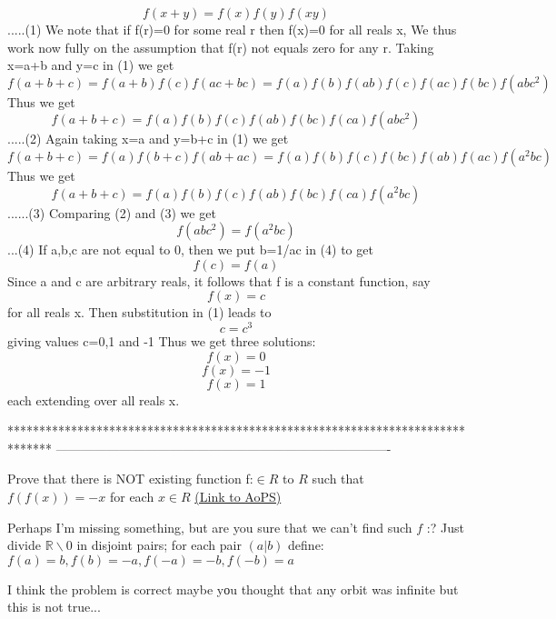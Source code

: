 \begin{mysolution}
	\[f(x+y)=f(x)f(y)f(xy)\]         .....(1)
We note that if f(r)=0 for some real r then f(x)=0 for all reals x,
We thus work now fully on the assumption that f(r) not equals zero for any r. 
 Taking x=a+b and y=c in (1) we get
  \[f(a+b+c)
    =f(a+b)f(c)f(ac+bc)
    =f(a)f(b)f(ab)f(c)f(ac)f(bc)f(abc^2)\]
Thus we get 
\[f(a+b+c)=f(a)f(b)f(c)f(ab)f(bc)f(ca)f(abc^2)\]     .....(2)
Again taking x=a and y=b+c in (1) we get
\[f(a+b+c)
=f(a)f(b+c)f(ab+ac)
=f(a)f(b)f(c)f(bc)f(ab)f(ac)f(a^2bc)\]
Thus we get
\[f(a+b+c)=f(a)f(b)f(c)f(ab)f(bc)f(ca)f(a^2bc)\]    ......(3)
Comparing (2) and (3) we get
\[f(abc^2)=f(a^2bc)\]            ...(4)
If a,b,c are not equal to 0, then we put b=1/ac in (4) to get
\[f(c)=f(a)\]
Since a and c are arbitrary reals, it follows that f is a constant function, say 
\[f(x)=c\] for all reals x.
Then substitution in (1) leads to
\[c=c^3\]
giving values c=0,1 and -1
Thus we get three solutions:
\[ f(x)=0\]
\[f(x)=-1\]
\[f(x)=1\]
each extending over all reals x.
\end{mysolution}
*******************************************************************************
-------------------------------------------------------------------------------

\begin{problem}
	Prove that there is NOT existing function f:$\in R$ to $R$ such that $f(f(x))=-x$ for each $x\in R$
	\flushright \href{https://artofproblemsolving.com/community/c6h56637}{(Link to AoPS)}
\end{problem}



\begin{mysolution}
	Perhaps I'm missing something, but are you sure that we can't find such $f$  :? 
Just divide $\mathbb{R}\backslash 0$ in disjoint pairs; for each pair $(a|b)$ define:
$f(a)=b, f(b)=-a, f(-a)=-b, f(-b)=a$
\end{mysolution}



\begin{mysolution}
	I think the problem is correct maybe yοu thought that any orbit was infinite but this is not true...
\end{mysolution}



